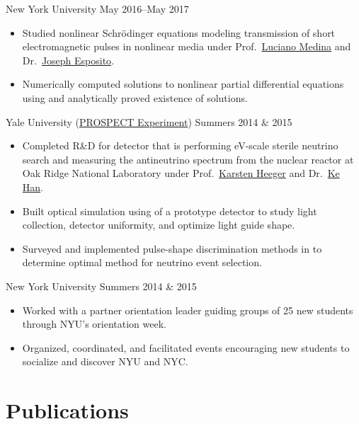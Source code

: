 \documentclass{cultvoucher}
\begin{document}
         {New York University}
         {May 2016--May 2017}
\begin{itemize}
    \item Studied nonlinear Schr\"{o}dinger equations modeling transmission of
          short electromagnetic pulses in nonlinear media under Prof.\
          \href{https://www.sites.google.com/a/nyu.edu/luciano-medina/}{Luciano Medina}
          and Dr.\ \href{https://cims.nyu.edu/~esposito/}{Joseph Esposito}.
    \item Numerically computed solutions to nonlinear partial differential
          equations using \keyword{python} and analytically proved existence of
          solutions.
\end{itemize}

         {Yale University (\href{http://prospect.yale.edu/}{PROSPECT Experiment})}
         {Summers 2014 \& 2015}
\begin{itemize}
    \item Completed R\&D for detector that is performing eV-scale sterile
          neutrino search and measuring the antineutrino spectrum from the
          nuclear reactor at Oak Ridge National Laboratory under Prof.\
          \href{http://heegerlab.yale.edu/karsten-heeger}{Karsten Heeger} and
          Dr.\ \href{https://www.physics.sjtu.edu.cn/en/people/1/kehan}{Ke Han}.
    \item Built optical simulation using \keyword{C++} of a prototype detector
          to study light collection, detector uniformity, and optimize light
          guide shape.
    \item Surveyed and implemented pulse-shape discrimination methods in
           to determine optimal method for neutrino event
          selection.
\end{itemize}

         {New York University}
         {Summers 2014 \& 2015}
\begin{itemize}
    \item Worked with a partner orientation leader guiding groups of 25 new
          students through NYU's orientation week.
    \item Organized, coordinated, and facilitated events encouraging new
          students to socialize and discover NYU and NYC.
\end{itemize}

\section{Publications}
\end{document}
